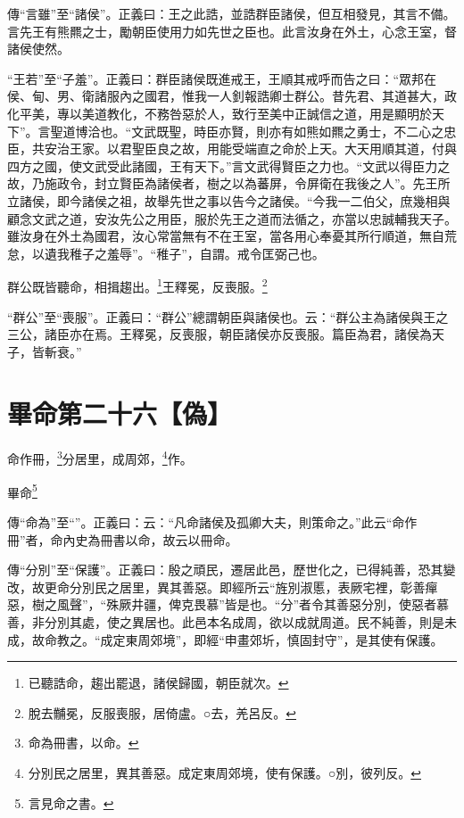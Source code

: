 {\noindent\zhuan{}\fzbyks 傳“言雖”至“諸侯”。正義曰：王之此誥，並誥群臣諸侯，但互相發見，其言不備。言先王有熊羆之士，勵朝臣使用力如先世之臣也。此言汝身在外土，心念王室，督諸侯使然。 \par}

{\noindent\shu{}\fzkt “王若”至“子羞”。正義曰：群臣諸侯既進戒王，王順其戒呼而告之曰：“眾邦在侯、甸、男、衛諸服內之國君，惟我一人釗報誥卿士群公。昔先君、其道甚大，政化平美，專以美道教化，不務咎惡於人，致行至美中正誠信之道，用是顯明於天下”。言聖道博洽也。“文武既聖，時臣亦賢，則亦有如熊如羆之勇士，不二心之忠臣，共安治王家。以君聖臣良之故，用能受端直之命於上天。大天用順其道，付與四方之國，使文武受此諸國，王有天下。”言文武得賢臣之力也。“文武以得臣力之故，乃施政令，封立賢臣為諸侯者，樹之以為蕃屏，令屏衛在我後之人”。先王所立諸侯，即今諸侯之祖，故舉先世之事以告今之諸侯。“今我一二伯父，庶幾相與顧念文武之道，安汝先公之用臣，服於先王之道而法循之，亦當以忠誠輔我天子。雖汝身在外土為國君，汝心常當無有不在王室，當各用心奉憂其所行順道，無自荒怠，以遺我稚子之羞辱”。“稚子”，自謂。戒令匡弼己也。 \par}

群公既皆聽命，相揖趨出。\footnote{已聽誥命，趨出罷退，諸侯歸國，朝臣就次。}王釋冕，反喪服。\footnote{脫去黼冕，反服喪服，居倚盧。○去，羌呂反。}

{\noindent\shu{}\fzkt “群公”至“喪服”。正義曰：“群公”總謂朝臣與諸侯也。云：“群公主為諸侯與王之三公，諸臣亦在焉。王釋冕，反喪服，朝臣諸侯亦反喪服。篇臣為君，諸侯為天子，皆斬衰。” \par}

\section{畢命第二十六【偽】}


命作冊，\footnote{命為冊書，以命。}分居里，成周郊，\footnote{分別民之居里，異其善惡。成定東周郊境，使有保護。○別，彼列反。}作。

畢命\footnote{言見命之書。}


{\noindent\zhuan{}\fzbyks 傳“命為”至“”。正義曰：云：“凡命諸侯及孤卿大夫，則策命之。”此云“命作冊”者，命內史為冊書以命，故云以冊命。 \par}

{\noindent\zhuan{}\fzbyks 傳“分別”至“保護”。正義曰：殷之頑民，遷居此邑，歷世化之，已得純善，恐其變改，故更命分別民之居里，異其善惡。即經所云“旌別淑慝，表厥宅裡，彰善癉惡，樹之風聲”，“殊厥井疆，俾克畏慕”皆是也。“分”者令其善惡分別，使惡者慕善，非分別其處，使之異居也。此邑本名成周，欲以成就周道。民不純善，則是未成，故命教之。“成定東周郊境”，即經“申畫郊圻，慎固封守”，是其使有保護。 \par}

